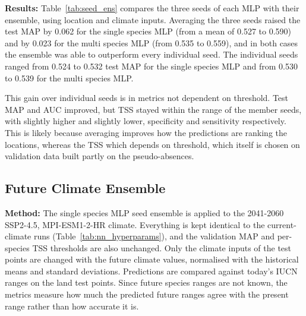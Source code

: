 \documentclass{article}
\begin{document}
\textbf{Results:} Table~\ref{tab:seed_ens} compares the three seeds of each MLP with their ensemble, using location and climate inputs. Averaging the three seeds raised the test MAP by 0.062 for the single species MLP (from a mean of 0.527 to 0.590) and by 0.023 for the multi species MLP (from 0.535 to 0.559), and in both cases the ensemble was able to outperform every individual seed. The individual seeds ranged from 0.524 to 0.532 test MAP for the single species MLP and from 0.530 to 0.539 for the multi species MLP.

This gain over individual seeds is in metrics not dependent on threshold. Test MAP and AUC improved, but TSS stayed within the range of the member seeds, with slightly higher and slightly lower, specificity and sensitivity respectively. This is likely because averaging improves how the predictions are ranking the locations, whereas the TSS which depends on threshold, which itself is chosen on validation data built partly on the pseudo-absences.

\subsection{Future Climate Ensemble}\label{app:fut_ensemble}
\textbf{Method:} The single species MLP seed ensemble is applied to the 2041-2060 SSP2-4.5, MPI-ESM1-2-HR climate. Everything is kept identical to the current-climate runs (Table~\ref{tab:nn_hyperparams}), and the validation MAP and per-species TSS thresholds are also unchanged. Only the climate inputs of the test points are changed with the future climate values, normalised with the historical means and standard deviations. Predictions are compared against today's IUCN ranges on the land test points. Since future species ranges are not known, the metrics measure how much the predicted future ranges agree with the present range rather than how accurate it is. 
\end{document}
